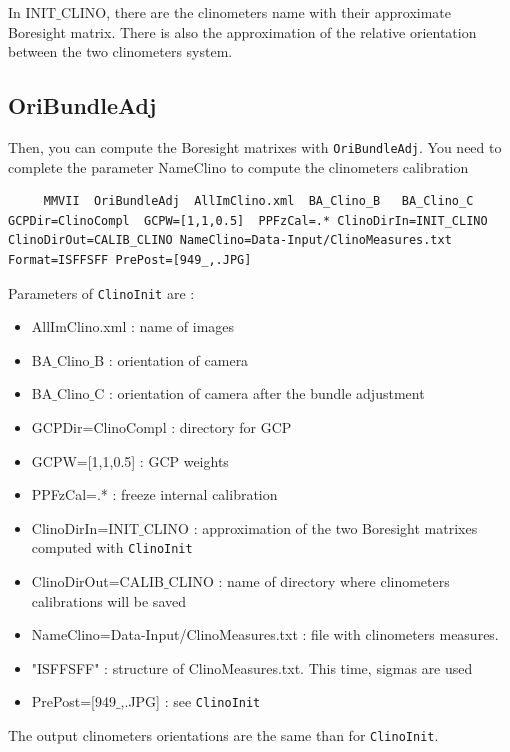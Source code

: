 In INIT$\_$CLINO, there are the clinometers name with their approximate Boresight matrix. There is also the approximation of the relative orientation between the two clinometers system.



\subsection{OriBundleAdj}

Then, you can compute the Boresight matrixes with {\tt OriBundleAdj}. You need to complete the parameter NameClino to compute the clinometers calibration

\begin{lstlisting}
     MMVII  OriBundleAdj  AllImClino.xml  BA_Clino_B   BA_Clino_C   GCPDir=ClinoCompl  GCPW=[1,1,0.5]  PPFzCal=.* ClinoDirIn=INIT_CLINO ClinoDirOut=CALIB_CLINO NameClino=Data-Input/ClinoMeasures.txt Format=ISFFSFF PrePost=[949_,.JPG]
\end{lstlisting}

Parameters of {\tt ClinoInit} are :
\begin{itemize}
     \item AllImClino.xml : name of images
     \item BA$\_$Clino$\_$B : orientation of camera
     \item BA$\_$Clino$\_$C : orientation of camera after the bundle adjustment
     \item GCPDir=ClinoCompl : directory for GCP
     \item GCPW=[1,1,0.5] : GCP weights
     \item PPFzCal=.* : freeze internal calibration
     \item ClinoDirIn=INIT$\_$CLINO : approximation of the two Boresight matrixes computed with {\tt ClinoInit}
     \item ClinoDirOut=CALIB$\_$CLINO : name of directory where clinometers calibrations will be saved
     \item NameClino=Data-Input/ClinoMeasures.txt : file with clinometers measures.
     \item "ISFFSFF" : structure of ClinoMeasures.txt. This time, sigmas are used
     \item PrePost=[949$\_$,.JPG] : see {\tt ClinoInit}
\end{itemize}

The output clinometers orientations are the same than for {\tt ClinoInit}.

